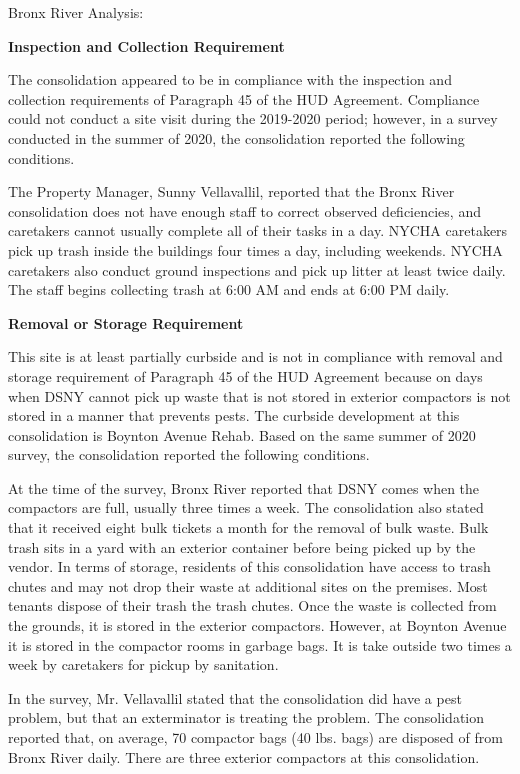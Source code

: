 Bronx River Analysis: 

\textbf{Inspection and Collection Requirement} 

 

The consolidation appeared to be in compliance with the inspection and collection requirements of Paragraph 45 of the HUD Agreement. Compliance could not conduct a site visit during the 2019-2020 period; however, in a survey conducted in the summer of 2020, the consolidation reported the following conditions.

The Property Manager, Sunny Vellavallil, reported that the Bronx River consolidation does not have enough staff to correct observed deficiencies, and caretakers cannot usually complete all of their tasks in a day. NYCHA caretakers pick up trash inside the buildings four times a day, including weekends. NYCHA caretakers also conduct ground inspections and pick up litter at least twice daily. The staff begins collecting trash at 6:00 AM and ends at 6:00 PM daily. 

\textbf{Removal or Storage Requirement} 

This site is at least partially curbside and is not in compliance with removal and storage requirement of Paragraph 45 of the HUD Agreement because on days when DSNY cannot pick up waste that is not stored in exterior compactors is not stored in a manner that prevents pests. The curbside development at this consolidation is Boynton Avenue Rehab. Based on the same summer of  2020 survey, the consolidation reported the following conditions.

At the time of the survey, Bronx River reported that DSNY comes when the compactors are full, usually three times a week. The consolidation also stated that it received eight bulk tickets a month for the removal of bulk waste.  Bulk trash sits in a yard with an exterior container before being picked up by the vendor.  In terms of storage, residents of this consolidation have access to trash chutes and may not drop their waste at additional sites on the premises. Most tenants dispose of their trash the trash chutes. Once the waste is collected from the grounds, it is stored in the exterior compactors. However, at Boynton Avenue it is stored in the compactor rooms in garbage bags. It is take outside two times a week by caretakers for pickup by sanitation.

 

In the survey, Mr. Vellavallil stated that the consolidation did have a pest problem, but that an exterminator is treating the problem. The consolidation reported that, on average, 70 compactor bags (40 lbs. bags)  are disposed of from Bronx River daily. There are three exterior compactors at this consolidation. 

